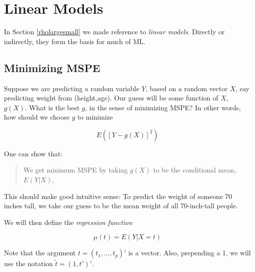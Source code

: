 \chapter{Linear Models}  
\label{chap:linmod}   

In Section \ref{rholargesmall} we made reference to \textit{linear
models}.  Directly or indirectly, they form the basis for much of ML.

\section{Minimizing MSPE}

Suppose we are predicting a random variable $Y$, based on a random
vector $X$, say predicting weight from (height,age).  Our guess will be
some function of $X$, $g(X)$.  What is the best $g$, in the sense of
minimizing MSPE?  In other words, how should we choose $g$ to minimize

\begin{equation}
\label{mspe}
E \left ( [Y - g(X)]^2 \right )
\end{equation}

% 
% 

One can show that:

\begin{quote}
We get minimum MSPE by taking $g(X)$ to be the conditional mean, $E(Y|X)$,
\end{quote}

This should make good intuitive sense:  To predict the weight of
someone 70 inches tall, we take our guess to be the mean weight of all
70-inch-tall people.

We will then define the \textit{regression function}

\begin{equation}
\mu(t) = E (Y | X = t)
\end{equation}

Note that the argument $t = (t_1,...,t_p)'$ is a vector.  
Also, prepending a 1, we will use the notation $\widetilde{t} = (1,t')'$.

